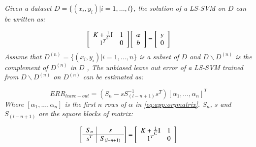 \begin{theorem}
\textit{Given a dataset $D=\{(x_i,y_i)|i=1,...,l\}$, the solution of a LS-SVM on $D$ can be written as:}
	
	\begin{equation}\label{eq:app:orgmatrix}
	\left[ {\begin{array}{*{20}{c}}
		{K  + \frac{1}{C}{\rm I}}\\
		1^T
		\end{array}\begin{array}{*{20}{c}}
		1\\
		0
		\end{array}} \right]\left[ {\begin{array}{*{20}{c}}
		\alpha \\
		b
		\end{array}} \right] = \left[ \begin{array}{l}
	y\\
	0
	\end{array} \right]
	\end{equation}
	\textit{Assume that $D^{(n)} = \{(x_i,y_i)|i=1,...,n\}$ is a subset of $D$ and $D\backslash D^{(n)}$ is the complement of $D^{(n)}$ in $D$ , The unbiased leave out error of a LS-SVM trained from $D\backslash D^{(n)}$ on $D^{(n)}$ can be estimated as:}
	
	\begin{equation*}%
	ERR_{leave-out} = \left( {{S_n} - sS_{(l - n + 1)}^{ - 1}{s^T}} \right){\left[ {{\alpha _1},...,{\alpha _n}} \right]^T}
	\end{equation*}
	\textit{Where $\left[\alpha_1,...,\alpha_n\right]$ is the first $n$ rows of $\alpha$ in \eqref{eq:app:orgmatrix}. $S_n$, $s$ and $S_{(l - n + 1)}$ are the square blocks of matrix:}
	
	\begin{equation*}
	\left[ {\begin{array}{c|c}
		{{S_{n }}} &s\\ \hline
		{{s^T}}&{{S_{(l - n + 1)}}}
		\end{array}} \right] =\left[ {\begin{array}{*{20}{c}}
		{K  + \frac{1}{C}{\rm I}}\\
		1^T
		\end{array}\begin{array}{*{20}{c}}
		1\\
		0
		\end{array}} \right]
	\end{equation*}
\end{theorem}
